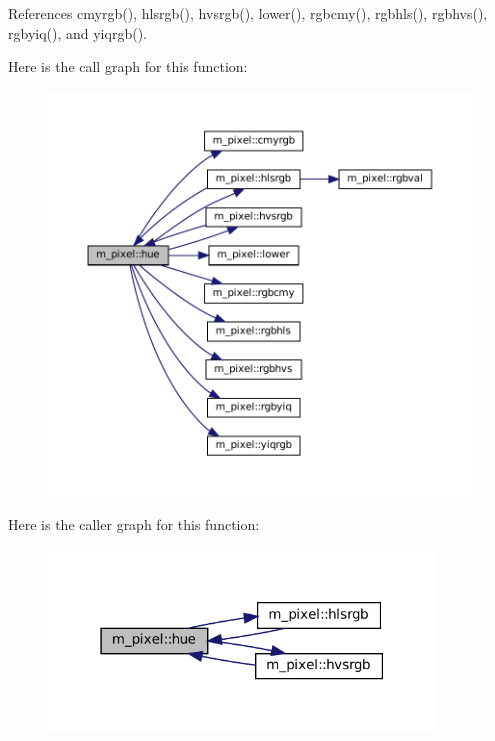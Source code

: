 References cmyrgb(), hlsrgb(), hvsrgb(), lower(), rgbcmy(), rgbhls(), rgbhvs(), rgbyiq(), and yiqrgb().

Here is the call graph for this function\+:
\nopagebreak
\begin{figure}[H]
\begin{center}
\leavevmode
\includegraphics[width=350pt]{namespacem__pixel_aa76d2ac385f3ad0bc2b555cc14b7d53f_cgraph}
\end{center}
\end{figure}
Here is the caller graph for this function\+:
\nopagebreak
\begin{figure}[H]
\begin{center}
\leavevmode
\includegraphics[width=291pt]{namespacem__pixel_aa76d2ac385f3ad0bc2b555cc14b7d53f_icgraph}
\end{center}
\end{figure}
\mbox{\label{namespacem__pixel_a6eda5641d5c42b51d9488bd7ea743744}} 
